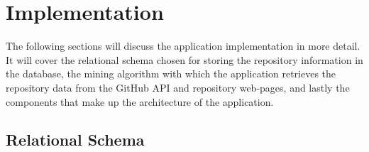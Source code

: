 \chapter{Implementation}\label{ch:4}

The following sections will discuss the application implementation in more detail.
It will cover the relational schema chosen for storing the repository information in the database, the mining algorithm with which the application retrieves the repository data from the GitHub API and repository web-pages, and lastly the components that make up the architecture of the application.

\section{Relational Schema}

